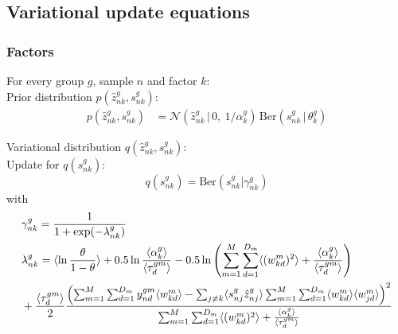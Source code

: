 \subsection{Variational update equations}

\subsubsection*{Factors}

For every group $g$, sample $n$ and factor $k$: \\

Prior distribution $p(\hat{z}_{nk}^g,s_{nk}^g)$:
\begin{align}
	p(\hat{z}_{nk}^g,s_{nk}^g) &= \mathcal{N} (\hat{z}_{nk}^g \,|\, 0, ~ 1/\alpha_k^g)\, \text{Ber}(s_{nk}^g \,|\,\theta_k^g)
\end{align}

Variational distribution $q(\hat{z}_{nk}^g,s_{nk}^g)$:\\

Update for $q(s_{nk}^g)$:
\begin{equation}
	q(s^g_{nk}) = \mathrm{Ber}(s^g_{nk}|\gamma^g_{nk})
\end{equation}
with
\begin{equation} \begin{aligned}
	&\gamma^g_{nk} = \frac{1}{1+\exp(-\lambda_{nk}^g)}\\
	& \lambda_{nk}^g = \langle \ln\frac{\theta}{1-\theta} \rangle + 0.5\ln\frac{\langle\alpha_k^g\rangle}{\langle\tau_d^{gm}\rangle} - 0.5\ln\left( \sum_{m=1}^M\sum_{d=1}^{D_m} \langle (w_{kd}^m)^2 \rangle + \frac{\langle\alpha_k^g\rangle}{\langle\tau_d^{gm}\rangle} \right) \\
	&+ \frac{\langle\tau_d^{gm}\rangle}{2} \frac{ \left( \sum_{m=1}^M\sum_{d=1}^{D_m} y_{nd}^{gm} \langle w^m_{kd} \rangle - \sum_{j \neq k} \langle s_{nj}^g\hat{z}_{nj}^g\rangle \sum_{m=1}^M\sum_{d=1}^{D_m} \langle w^m_{kd} \rangle \langle w^m_{jd} \rangle \right)^2} {\sum_{m=1}^M\sum_{d=1}^{D_m} \langle (w_{kd}^m)^2 \rangle + \frac{\langle\alpha_k^g\rangle}{\langle\tau_d^{gm}\rangle} }
\end{aligned} \end{equation}

